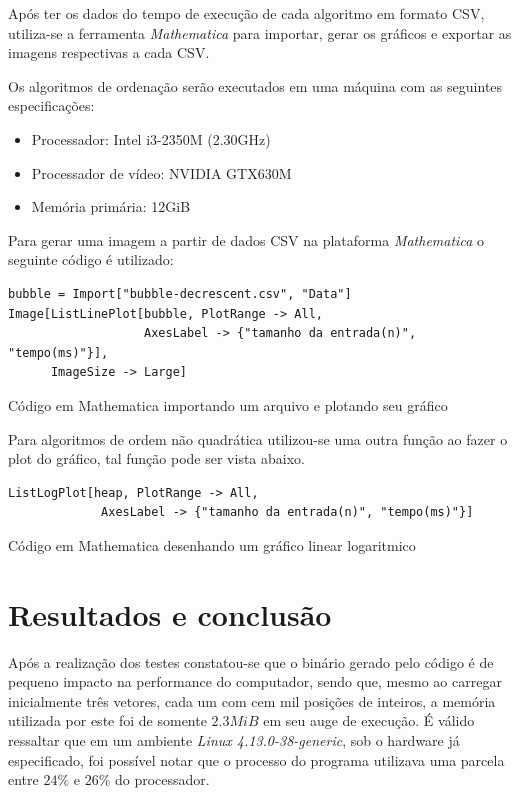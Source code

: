 \documentclass[a4paper, 12pt]{report}
\begin{document}
Após ter os dados do tempo de execução de cada algoritmo em formato CSV,
utiliza-se a ferramenta \emph{Mathematica} para importar, gerar os gráficos e
exportar as imagens respectivas a cada CSV.

Os algoritmos de ordenação serão executados em uma máquina com as seguintes
especificações:

\begin{itemize}
\item Processador: Intel i3-2350M (2.30GHz)
\item Processador de vídeo: NVIDIA GTX630M
\item Memória primária: 12GiB
\end{itemize}

Para gerar uma imagem a partir de dados CSV na plataforma \emph{Mathematica} o
seguinte código é utilizado:

\begin{listing}[H]
\begin{verbatim}
bubble = Import["bubble-decrescent.csv", "Data"]
Image[ListLinePlot[bubble, PlotRange -> All,
                   AxesLabel -> {"tamanho da entrada(n)", "tempo(ms)"}],
      ImageSize -> Large]
\end{verbatim}
\caption{Código em Mathematica importando um arquivo e plotando seu gráfico}
\end{listing}

Para algoritmos de ordem não quadrática utilizou-se uma outra função ao fazer
o plot do gráfico, tal função pode ser vista abaixo.

\begin{listing}[H]
\begin{verbatim}
ListLogPlot[heap, PlotRange -> All,
             AxesLabel -> {"tamanho da entrada(n)", "tempo(ms)"}]
\end{verbatim}
\caption{Código em Mathematica desenhando um gráfico linear logaritmico}
\end{listing}

\part{Resultados e conclusão}
\label{sec-4}
Após a realização dos testes constatou-se que o binário gerado pelo código é
de pequeno impacto na performance do computador, sendo que, mesmo ao carregar
inicialmente três vetores, cada um com cem mil posições de inteiros, a memória
utilizada por este foi de somente $2.3MiB$ em seu auge de execução. É válido
ressaltar que em um ambiente \emph{Linux 4.13.0-38-generic}, sob o hardware já
especificado, foi possível notar que o processo do programa utilizava uma
parcela entre $24\%$ e $26\%$ do processador.
\end{document}
